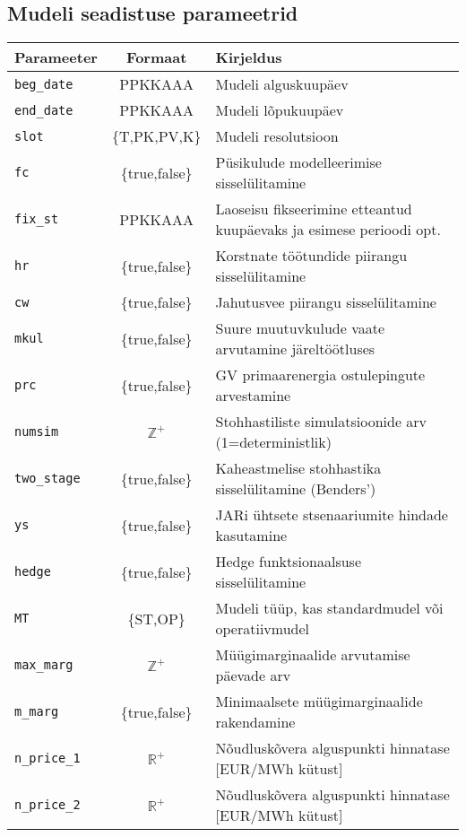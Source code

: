 \begin{landscape}
\section{Mudeli seadistuse parameetrid}
\label{app:seadistus}
\small
\begin{longtable}{l c l}
Parameeter & Formaat & Kirjeldus \\
\hline
\texttt{beg\_date} &  PPKKAAA       & Mudeli alguskuupäev \\
\texttt{end\_date} &  PPKKAAA       & Mudeli lõpukuupäev  \\
\texttt{slot}      &  \{T,PK,PV,K\} & Mudeli resolutsioon \\
\texttt{fc}        &  \{true,false\}& Püsikulude modelleerimise sisselülitamine \\
\texttt{fix\_st}   &  PPKKAAA       & Laoseisu fikseerimine etteantud kuupäevaks ja esimese perioodi opt.\\
\texttt{hr}        &  \{true,false\}& Korstnate töötundide piirangu sisselülitamine \\
\texttt{cw}        &  \{true,false\}& Jahutusvee piirangu sisselülitamine \\
\texttt{mkul}      &  \{true,false\}& Suure muutuvkulude vaate arvutamine järeltöötluses \\
\texttt{prc}       &  \{true,false\}& GV primaarenergia ostulepingute arvestamine \\
\texttt{numsim}    &  $\mathbb{Z}^+$& Stohhastiliste simulatsioonide arv (1=deterministlik)\\
\texttt{two\_stage}&  \{true,false\}& Kaheastmelise stohhastika sisselülitamine (Benders') \\
\texttt{ys}        &  \{true,false\}& JARi ühtsete stsenaariumite hindade kasutamine\\
\texttt{hedge}     &  \{true,false\}& Hedge funktsionaalsuse sisselülitamine \\
\texttt{MT}        &  \{ST,OP\}     & Mudeli tüüp, kas standardmudel või operatiivmudel  \\ 
\texttt{max\_marg} &  $\mathbb{Z}^+$  & Müügimarginaalide arvutamise päevade arv \\
\texttt{m\_marg}   &  \{true,false\}  & Minimaalsete müügimarginaalide rakendamine \\
\texttt{n\_price\_1}&  $\mathbb{R}^+$  & Nõudluskõvera alguspunkti hinnatase [EUR/MWh kütust]\\
\texttt{n\_price\_2}&  $\mathbb{R}^+$  & Nõudluskõvera alguspunkti hinnatase [EUR/MWh kütust]\\

\end{longtable}
\end{landscape}
